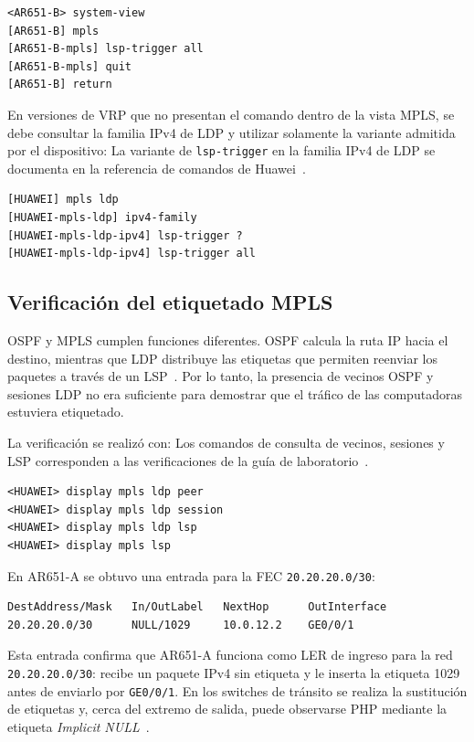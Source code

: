 \begin{lstlisting}[style=terminal]
<AR651-B> system-view
[AR651-B] mpls
[AR651-B-mpls] lsp-trigger all
[AR651-B-mpls] quit
[AR651-B] return
\end{lstlisting}

En versiones de VRP que no presentan el comando dentro de la vista MPLS, se
debe consultar la familia IPv4 de LDP y utilizar solamente la variante admitida
por el dispositivo:
La variante de \texttt{lsp-trigger} en la familia IPv4 de LDP se documenta
en la referencia de comandos de Huawei~\cite{huawei-lsp-trigger-ipv4}.


\begin{lstlisting}[style=terminal]
[HUAWEI] mpls ldp
[HUAWEI-mpls-ldp] ipv4-family
[HUAWEI-mpls-ldp-ipv4] lsp-trigger ?
[HUAWEI-mpls-ldp-ipv4] lsp-trigger all
\end{lstlisting}

\subsection{Verificación del etiquetado MPLS}

OSPF y MPLS cumplen funciones diferentes. OSPF calcula la ruta IP hacia el
destino, mientras que LDP distribuye las etiquetas que permiten reenviar los
paquetes a través de un LSP~\cite[partes~1 y~3]{guia-mpls-ar651-s6730h}. Por lo tanto, la presencia de vecinos OSPF y
sesiones LDP no era suficiente para demostrar que el tráfico de las
computadoras estuviera etiquetado.

La verificación se realizó con:
Los comandos de consulta de vecinos, sesiones y LSP corresponden a las
verificaciones de la guía de laboratorio~\cite[tareas~3.3--3.4]{guia-mpls-ar651-s6730h}.


\begin{lstlisting}[style=terminal]
<HUAWEI> display mpls ldp peer
<HUAWEI> display mpls ldp session
<HUAWEI> display mpls ldp lsp
<HUAWEI> display mpls lsp
\end{lstlisting}

En AR651-A se obtuvo una entrada para la FEC \texttt{20.20.20.0/30}:

\begin{lstlisting}[style=terminal]
DestAddress/Mask   In/OutLabel   NextHop      OutInterface
20.20.20.0/30      NULL/1029     10.0.12.2    GE0/0/1
\end{lstlisting}

Esta entrada confirma que AR651-A funciona como LER de ingreso para la red
\texttt{20.20.20.0/30}: recibe un paquete IPv4 sin etiqueta y le inserta la
etiqueta 1029 antes de enviarlo por \texttt{GE0/0/1}. En los switches de
tránsito se realiza la sustitución de etiquetas y, cerca del extremo de
salida, puede observarse PHP mediante la etiqueta \textit{Implicit NULL}~\cite[tarea~2.3 y pregunta~5.2]{guia-mpls-ar651-s6730h}.


